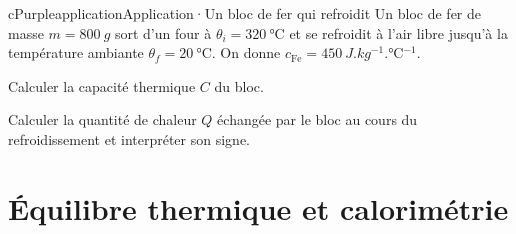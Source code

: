 \documentclass[11pt,a4paper]{article}
\newcommand{\dC}[1]{\qty{#1}{\degreeCelsius}}
\begin{document}
\begin{rub}[unbreakable]{cPurple}{application}{Application\enspace·\enspace Un bloc de fer qui refroidit}
Un bloc de fer de masse $m = \qty{800}{g}$ sort d’un four à $\theta_i = \dC{320}$ et se refroidit à l’air libre jusqu’à la température ambiante $\theta_f = \dC{20}$. On donne $c_{\mathrm{Fe}} = \qty{450}{J.kg^{-1}.\degreeCelsius^{-1}}$.
\begin{appq}
  \item Calculer la capacité thermique $C$ du bloc.
  \item Calculer la quantité de chaleur $Q$ échangée par le bloc au cours du refroidissement et interpréter son signe.
\end{appq}
\end{rub}

\needspace{15cm}
\section{Équilibre thermique et calorimétrie}
\end{document}
